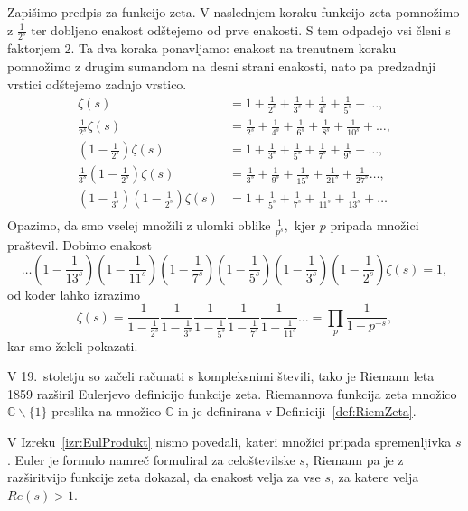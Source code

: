\documentclass[mat1]{fmfdelo}
\begin{document}
\begin{dokaz}
Zapišimo predpis za funkcijo zeta. V naslednjem koraku funkcijo zeta pomnožimo z $\frac{1}{2^s}$ ter dobljeno enakost odštejemo od prve enakosti. S tem odpadejo vsi členi s faktorjem $2$. Ta dva koraka ponavljamo: enakost na trenutnem koraku pomnožimo z drugim sumandom na desni strani enakosti, nato pa predzadnji vrstici odštejemo zadnjo vrstico.
\begin{align*}
	\zeta(s) &= 1 + \frac{1}{2^s} + \frac{1}{3^s} + \frac{1}{4^s} + \frac{1}{5^s} + \ldots, \nonumber \\
	\frac{1}{2^s} \zeta(s) &= \frac{1}{2^s} + \frac{1}{4^s} + \frac{1}{6^s} + \frac{1}{8^s} + \frac{1}{10^s} + \ldots, \nonumber \\
	\left(1-\frac{1}{2^s}\right) \zeta(s) &= 1 + \frac{1}{3^s} + \frac{1}{5^s} + \frac{1}{7^s} + \frac{1}{9^s} + \ldots, \nonumber \\
	\frac{1}{3^s} \left(1-\frac{1}{2^s}\right) \zeta(s) &= \frac{1}{3^s} + \frac{1}{9^s} + \frac{1}{15^s} + \frac{1}{21^s} + \frac{1}{27^s} \ldots, \nonumber \\
	\left(1-\frac{1}{3^s}\right)\left (1-\frac{1}{2^s}\right) \zeta(s) &= 1 + \frac{1}{5^s} + \frac{1}{7^s} + \frac{1}{11^s} + \frac{1}{13^s} + \ldots \nonumber \\
\end{align*}
Opazimo, da smo vselej množili z ulomki oblike $\frac{1}{p^s},$ kjer $p$ pripada množici praštevil. Dobimo enakost
	\[ \ldots \left(1-\frac{1}{13^s}\right) \left(1-\frac{1}{11^s}\right) \left(1-\frac{1}{7^s}\right) \left(1-\frac{1}{5^s}\right) \left(1-\frac{1}{3^s}\right) 		\left(1-\frac{1}{2^s}\right) \zeta(s) = 1, \]
od koder lahko izrazimo
	\[ \zeta(s) = \frac{1}{1-\frac{1}{2^s}} \frac{1}{1-\frac{1}{3^s}} \frac{1}{1-\frac{1}{5^s}} \frac{1}{1-\frac{1}{7^s}} \frac{1}{1-\frac{1}{11^s}} \ldots = 		\prod_{p}\frac{1}{1-p^{-s}}, \]
kar smo želeli pokazati.
\end{dokaz}

V 19.~stoletju so začeli računati s kompleksnimi števili, tako je Riemann leta 1859 razširil Eulerjevo definicijo funkcije zeta. Riemannova funkcija zeta množico  $\mathbb{C}\backslash\{1\}$ preslika na množico  $\mathbb{C}$ in je definirana v Definiciji~\ref{def:RiemZeta}.

\begin{opomba}
V Izreku~\ref{izr:EulProdukt} nismo povedali, kateri množici pripada spremenljivka $s$. Euler je formulo namreč formuliral za celoštevilske $s$, Riemann pa je z razširitvijo funkcije zeta dokazal, da enakost velja za vse $s$, za katere velja $Re(s)>1$.
\end{opomba}
\end{document}
